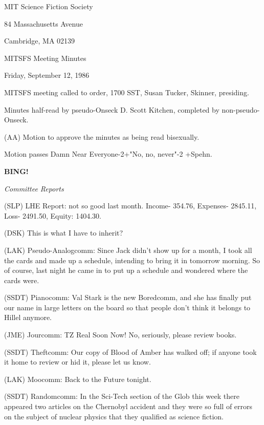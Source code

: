 \documentclass[12pt]{article}
\newcommand{\bing}{{\bf BING!} }
\newcommand{\goto}[1]{\bing \vskip 12pt \centerline{{\em{#1}}}}
\begin{document}
\begin{center}

MIT Science Fiction Society 

84 Massachusetts Avenue

Cambridge, MA 02139

\vspace{12pt}

MITSFS Meeting Minutes 

Friday, September 12, 1986

\end{center}
 
\vspace{18pt}

\setlength{\parskip}{6pt}

\noindent
MITSFS meeting called to order, 1700 SST,
Susan Tucker, Skinner, presiding.

Minutes half-read by pseudo-Onseck D. Scott Kitchen, completed by non-pseudo-Onseck.

(AA) Motion to approve the minutes as being read bisexually.

Motion passes Damn Near Everyone-2+"No, no, never"-2 +Spehn.

\goto{Committee Reports}

(SLP) LHE Report: not so good last month. Income- 354.76, Expenses- 2845.11, Loss- 2491.50, Equity: 1404.30.

(DSK) This is what I have to inherit?

(LAK) Pseudo-Analogcomm: Since Jack didn't show up for a month, I took all the cards and made up a schedule, intending to bring it in tomorrow morning. So of course, last night he came in to put up a schedule and wondered where the cards were.

(SSDT) Pianocomm: Val Stark is the new Boredcomm, and she has finally put our name in large letters on the board so that people don't think it belongs to Hillel anymore.

(JME) Jourcomm: TZ Real Soon Now! No, seriously, please review books.

(SSDT) Theftcomm: Our copy of Blood of Amber has walked off; if anyone took it home to review or hid it, please let us know.

(LAK) Moocomm: Back to the Future tonight.

(SSDT) Randomcomm: In the Sci-Tech section of the Glob this week there appeared two articles on the Chernobyl accident and they were so full of errors on the subject of nuclear physics that they qualified as science fiction.
\end{document}
